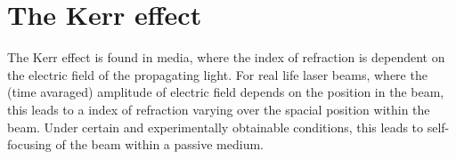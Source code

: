 \chapter{The Kerr effect}
\label{cha:kerr}

The Kerr effect is found in media, where the index of refraction is
dependent on the electric field of the propagating light. For real
life laser beams, where the (time avaraged) amplitude of electric
field depends on the position in the beam, this leads to a index of
refraction varying over the spacial position within the beam. Under
certain and experimentally obtainable conditions, this leads to
self-focusing of the beam within a passive medium.





